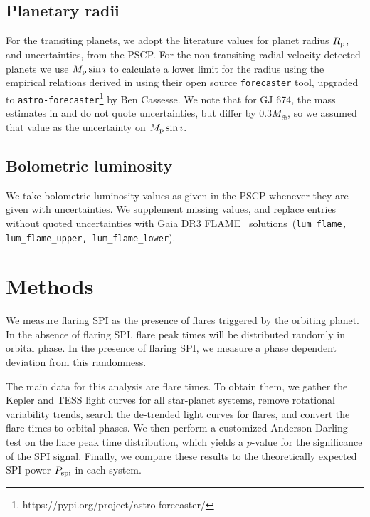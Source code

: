 \documentclass[twocolumn]{aastex631}
\begin{document}


\subsection{Planetary radii}
\label{sec:data:planetradii}
For the transiting planets, we adopt the literature values for planet radius $R_{\rm p}$, and uncertainties, from the PSCP. For the non-transiting radial velocity detected planets we use  $M_{\rm p}\sin i$ to calculate a lower limit for the radius using the empirical relations derived in \cite{chen2017probabilistic} using their open source \texttt{forecaster} tool, upgraded to \texttt{astro-forecaster}\footnote{https://pypi.org/project/astro-forecaster/} by Ben Cassesse. We note that for GJ 674, the mass estimates in \cite{bonfils2007harps} and \cite{boisse2011disentangling} do not quote uncertainties, but differ by $0.3M_\oplus$, so we assumed that value as the uncertainty on $M_{\rm p}\sin i$.

\subsection{Bolometric luminosity}
\label{sec:data:lum}

We take bolometric luminosity values as given in the PSCP whenever they are given with uncertainties. We supplement missing values, and replace entries without quoted uncertainties with Gaia DR3 FLAME~\citep{fouesneau2022gaia} solutions~(\texttt{lum\_flame, lum\_flame\_upper, lum\_flame\_lower}). 

\section{Methods}
\label{sec:methods}
We measure flaring SPI as the presence of flares triggered by the orbiting planet. In the absence of flaring SPI, flare peak times will be distributed randomly in orbital phase. In the presence of flaring SPI, we measure a phase dependent deviation from this randomness.

The main data for this analysis are flare times. To obtain them, we gather the Kepler and TESS light curves for all star-planet systems, remove rotational variability trends, search the de-trended light curves for flares, and convert the flare times to orbital phases. We then perform a customized Anderson-Darling test on the flare peak time distribution, which yields a $p$-value for the significance of the SPI signal. Finally, we compare these results to the theoretically expected SPI power $P_{\rm spi}$ in each system.
\end{document}
